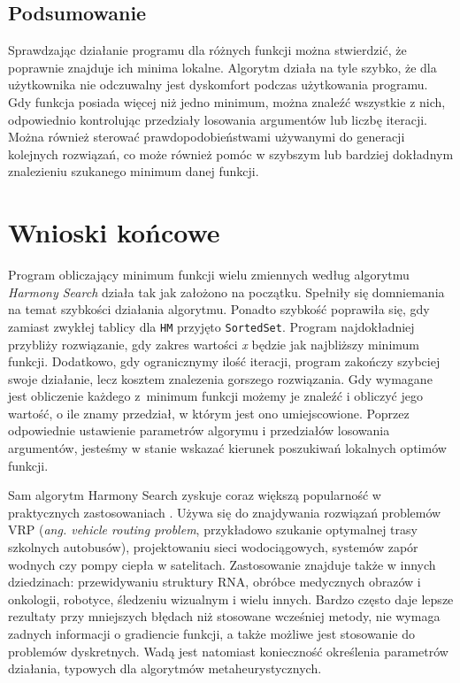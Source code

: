 \documentclass[10pt, a4paper]{article}
\begin{document}
\subsection{Podsumowanie}
\label{subsec:podsumowanietestow}
Sprawdzając działanie programu dla różnych funkcji można stwierdzić, że poprawnie znajduje ich minima lokalne. Algorytm działa na tyle szybko, że dla użytkownika nie odczuwalny jest dyskomfort podczas użytkowania programu. Gdy funkcja posiada więcej niż jedno minimum, można znaleźć wszystkie z nich, odpowiednio kontrolując przedziały losowania argumentów lub liczbę iteracji. Można również sterować prawdopodobieństwami używanymi do generacji kolejnych rozwiązań, co może również pomóc w szybszym lub bardziej dokładnym znalezieniu szukanego minimum danej funkcji.

\pagebreak

\section{Wnioski końcowe}
\label{sec:wnioski}
Program obliczający minimum funkcji wielu zmiennych według algorytmu {\em Harmony Search} działa tak jak założono na początku. Spełniły się domniemania na temat szybkości działania algorytmu. Ponadto szybkość poprawiła się, gdy zamiast zwykłej tablicy dla {\tt HM} przyjęto {\tt SortedSet}. Program najdokładniej przybliży rozwiązanie, gdy zakres wartości {\em x} będzie jak najbliższy minimum funkcji. Dodatkowo, gdy ogranicznymy ilość iteracji, program zakończy szybciej swoje działanie, lecz kosztem znalezenia gorszego rozwiązania. Gdy wymagane jest obliczenie każdego z~minimum funkcji możemy je znaleźć i obliczyć jego wartość, o ile znamy przedział, w którym jest ono umiejscowione. Poprzez odpowiednie ustawienie parametrów algorymu i przedziałów losowania argumentów, jesteśmy w stanie wskazać kierunek poszukiwań lokalnych optimów funkcji.

Sam algorytm Harmony Search zyskuje coraz większą popularność w praktycznych zastosowaniach \cite{bib:geempdf}. Używa się do znajdywania rozwiązań problemów VRP ({\em ang. vehicle routing problem}, przykładowo szukanie optymalnej trasy szkolnych autobusów), projektowaniu sieci wodociągowych, systemów zapór wodnych czy pompy ciepła w satelitach. Zastosowanie znajduje także w innych dziedzinach: przewidywaniu struktury RNA, obróbce medycznych obrazów i onkologii, robotyce, śledzeniu wizualnym i wielu innych. Bardzo często daje lepsze rezultaty przy mniejszych błędach niż stosowane wcześniej metody, nie wymaga zadnych informacji o gradiencie funkcji, a także możliwe jest stosowanie do problemów dyskretnych. Wadą jest natomiast konieczność określenia parametrów działania, typowych dla algorytmów metaheurystycznych.

\newpage
{}


\end{document}
